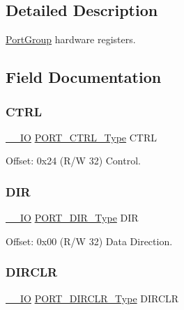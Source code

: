 \subsection{Detailed Description}
\mbox{\hyperlink{struct_port_group}{Port\+Group}} hardware registers. 

\subsection{Field Documentation}
\mbox{\label{struct_port_group_a43444687a8814be2e0ce096ecc188389}} 
\subsubsection{\texorpdfstring{CTRL}{CTRL}}
{\footnotesize\ttfamily \mbox{\hyperlink{core__cm0plus_8h_aec43007d9998a0a0e01faede4133d6be}{\+\_\+\+\_\+\+IO}} \mbox{\hyperlink{union_p_o_r_t___c_t_r_l___type}{P\+O\+R\+T\+\_\+\+C\+T\+R\+L\+\_\+\+Type}} C\+T\+RL}



Offset\+: 0x24 (R/W 32) Control. 

\mbox{\label{struct_port_group_a4f40710bb20a5c26b854f025dcaf98ed}} 
\subsubsection{\texorpdfstring{DIR}{DIR}}
{\footnotesize\ttfamily \mbox{\hyperlink{core__cm0plus_8h_aec43007d9998a0a0e01faede4133d6be}{\+\_\+\+\_\+\+IO}} \mbox{\hyperlink{union_p_o_r_t___d_i_r___type}{P\+O\+R\+T\+\_\+\+D\+I\+R\+\_\+\+Type}} D\+IR}



Offset\+: 0x00 (R/W 32) Data Direction. 

\mbox{\label{struct_port_group_a5c1f883a6c080fb0696d7ec5d3c9b89b}} 
\subsubsection{\texorpdfstring{DIRCLR}{DIRCLR}}
{\footnotesize\ttfamily \mbox{\hyperlink{core__cm0plus_8h_aec43007d9998a0a0e01faede4133d6be}{\+\_\+\+\_\+\+IO}} \mbox{\hyperlink{union_p_o_r_t___d_i_r_c_l_r___type}{P\+O\+R\+T\+\_\+\+D\+I\+R\+C\+L\+R\+\_\+\+Type}} D\+I\+R\+C\+LR}



